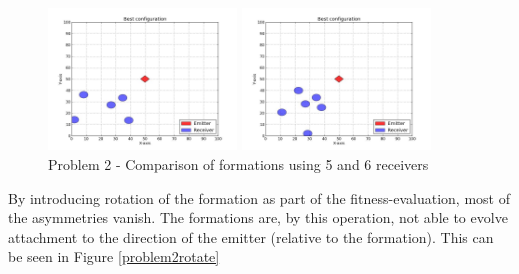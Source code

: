 \documentclass[10pt,a4paper]{book}
\begin{document}
\begin{figure}[H]
\begin{minipage}{50mm}
\end{minipage}
\begin{minipage}{50mm}
  \centering
  \includegraphics[width=50mm]{Problem2NoRotateRecv5_3.jpg}
\end{minipage} 
\begin{minipage}{50mm}
  \centering
  \includegraphics[width=50mm]{Problem2NoRotateRecv6_3.jpg}
\end{minipage}
\caption{Problem 2 - Comparison of formations using 5 and 6 receivers}
\label{problem2comparison56receivers}
\end{figure}

\newpage

By introducing rotation of the formation as part of the fitness-evaluation, most of the asymmetries vanish. The formations are, by this operation, not able to evolve attachment to the direction of the emitter (relative to the formation). This can be seen in Figure \ref{problem2rotate}
\end{document}
